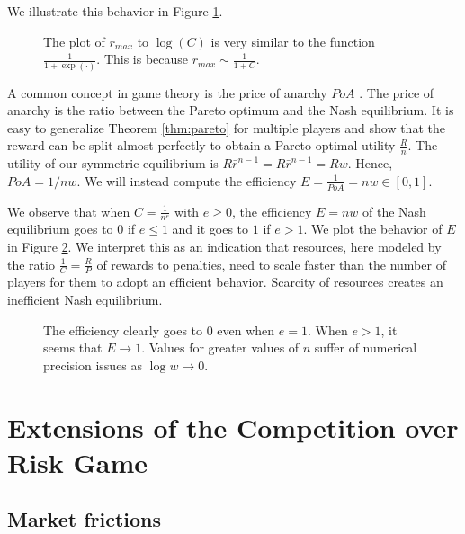 \documentclass[preprint,12pt,authoryear]{elsarticle}
\theoremstyle{definition}
\begin{document}
We illustrate this behavior in Figure \ref{fig:cutoff-asymptotic}.

\begin{figure}[htbp]
    \centering
    
    \caption{The plot of $r_{max}$ to $\log(C)$ is very similar to the function $\frac{1}{1 + \exp(\cdot)}$. This is because $r_{max} \sim \frac{1}{1+C}$.}
    \label{fig:cutoff-asymptotic}
\end{figure}



A common concept in game theory is the price of anarchy $PoA$ \citep{koutsoupias1999worst}. The price of anarchy is the ratio between the Pareto optimum and the Nash equilibrium. It is easy to generalize Theorem \ref{thm:pareto} for multiple players and show that the reward can be split almost perfectly to obtain a Pareto optimal utility $\frac{R}{n}$. The utility of our symmetric equilibrium is $R \bar r ^ {n-1} = R \bar r ^ {n-1} = R w$. Hence, $PoA = 1 / n w$. We will instead compute the efficiency $E = \frac{1}{PoA} = n w \in [0,1]$.


We observe that when $C = \frac{1}{n^e}$ with $e \ge 0$, the efficiency $E = n w$ of the Nash equilibrium goes to $0$ if $e \le 1$ and it goes to $1$ if $e > 1$. We plot the behavior of $E$ in Figure \ref{fig:efficiency}.
We interpret this as an indication that resources, here modeled by the ratio $\frac{1}{C} = \frac{R}{P}$ of rewards to penalties, need to scale faster than the number of players for them to adopt an efficient behavior. Scarcity of resources creates an inefficient Nash equilibrium.

\begin{figure}[htbp]
    \centering
    
    \caption{The efficiency clearly goes to $0$ even when $e = 1$. When $e>1$, it seems that $E \rightarrow 1$. Values for greater values of $n$ suffer of numerical precision issues as $\log w \rightarrow 0$.}
    \label{fig:efficiency}
\end{figure}

\section{Extensions of the Competition over Risk Game}


\subsection{Market frictions}
\end{document}
